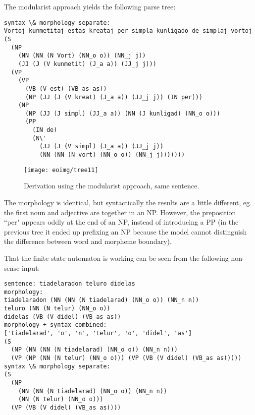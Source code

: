\documentclass[10pt,a4paper]{article}
\begin{document}
The modularist approach yields the following parse tree:

\begin{verbatim}
syntax \& morphology separate:
Vortoj kunmetitaj estas kreataj per simpla kunligado de simplaj vortoj 
(S
  (NP
    (NN (NN (N Vort) (NN_o o)) (NN_j j))
    (JJ (J (V kunmetit) (J_a a)) (JJ_j j)))
  (VP
    (VP
      (VB (V est) (VB_as as))
      (NP (JJ (J (V kreat) (J_a a)) (JJ_j j)) (IN per)))
    (NP
      (NP (JJ (J simpl) (JJ_a a)) (NN (J kunligad) (NN_o o)))
      (PP
        (IN de)
        (N\'
          (JJ (J (V simpl) (J_a a)) (JJ_j j))
          (NN (NN (N vort) (NN_o o)) (NN_j j)))))))
\end{verbatim}

\begin{figure}
\centering
\texttt{[image: eoimg/tree11]}
\caption{Derivation using the modularist approach, same sentence.}
\label{s4}
\end{figure}

The morphology is identical, but syntactically the results are a little
different, eg. the first noun and adjective are together in an NP. However,
the preposition ``per" appears oddly at the end of an NP, instead of
introducing a PP (in the previous tree it ended up prefixing an NP because the
model cannot distinguish the difference between word and morpheme boundary).

That the finite state automaton is working can be seen from
the following non-sense input:

\begin{verbatim}
sentence: tiadelaradon teluro didelas
morphology:
tiadelaradon (NN (NN (N tiadelarad) (NN_o o)) (NN_n n))
teluro (NN (N telur) (NN_o o))
didelas (VB (V didel) (VB_as as))
morphology + syntax combined:
['tiadelarad', 'o', 'n', 'telur', 'o', 'didel', 'as']
(S
  (NP (NN (NN (N tiadelarad) (NN_o o)) (NN_n n)))
  (VP (NP (NN (N telur) (NN_o o))) (VP (VB (V didel) (VB_as as)))))
syntax \& morphology separate:
(S
  (NP
    (NN (NN (N tiadelarad) (NN_o o)) (NN_n n))
    (NN (N telur) (NN_o o)))
  (VP (VB (V didel) (VB_as as))))
\end{verbatim}
\end{document}
